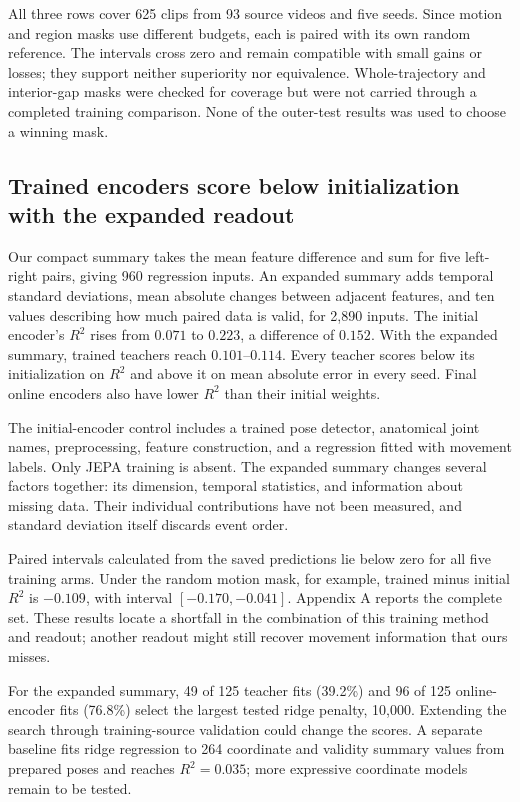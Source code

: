\documentclass{article}
\begin{document}
All three rows cover 625 clips from 93 source videos and five seeds. Since motion and region masks use different budgets, each is paired with its own random reference. The intervals cross zero and remain compatible with small gains or losses; they support neither superiority nor equivalence. Whole-trajectory and interior-gap masks were checked for coverage but were not carried through a completed training comparison. None of the outer-test results was used to choose a winning mask.

\subsection{Trained encoders score below initialization with the expanded readout}\label{trained-encoders-score-below-initialization-with-the-expanded-readout}

Our compact summary takes the mean feature difference and sum for five left-right pairs, giving 960 regression inputs. An expanded summary adds temporal standard deviations, mean absolute changes between adjacent features, and ten values describing how much paired data is valid, for 2,890 inputs. The initial encoder's \(R^2\) rises from \(0.071\) to \(0.223\), a difference of \(0.152\). With the expanded summary, trained teachers reach \(0.101\)--\(0.114\). Every teacher scores below its initialization on \(R^2\) and above it on mean absolute error in every seed. Final online encoders also have lower \(R^2\) than their initial weights.

The initial-encoder control includes a trained pose detector, anatomical joint names, preprocessing, feature construction, and a regression fitted with movement labels. Only JEPA training is absent. The expanded summary changes several factors together: its dimension, temporal statistics, and information about missing data. Their individual contributions have not been measured, and standard deviation itself discards event order.

Paired intervals calculated from the saved predictions lie below zero for all five training arms. Under the random motion mask, for example, trained minus initial \(R^2\) is \(-0.109\), with interval \([-0.170,-0.041]\). Appendix A reports the complete set. These results locate a shortfall in the combination of this training method and readout; another readout might still recover movement information that ours misses.

For the expanded summary, 49 of 125 teacher fits (39.2\%) and 96 of 125 online-encoder fits (76.8\%) select the largest tested ridge penalty, 10,000. Extending the search through training-source validation could change the scores. A separate baseline fits ridge regression to 264 coordinate and validity summary values from prepared poses and reaches \(R^2=0.035\); more expressive coordinate models remain to be tested.
\end{document}
